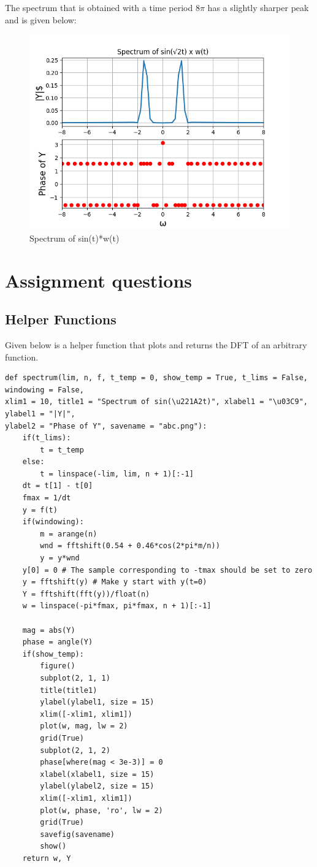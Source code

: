 \documentclass{article}
\begin{document}
The spectrum that is obtained with a time period $8\pi$ has a slightly sharper peak and is given below:
\begin{figure}[h!]
\centering
\includegraphics[scale=0.6]{fig10-7.png}
\caption{Spectrum of sin(t)*w(t)}
\label{fig:universe}
\end{figure}

\section{Assignment questions}

\subsection{Helper Functions}
Given below is a helper function that plots and returns the DFT of an arbitrary function.

\lstset{language=Python}
\lstset{frame=lines}
\lstset{basicstyle=\footnotesize}
\begin{lstlisting}
def spectrum(lim, n, f, t_temp = 0, show_temp = True, t_lims = False, windowing = False, 
xlim1 = 10, title1 = "Spectrum of sin(\u221A2t)", xlabel1 = "\u03C9", ylabel1 = "|Y|", 
ylabel2 = "Phase of Y", savename = "abc.png"):
    if(t_lims):
        t = t_temp
    else:
        t = linspace(-lim, lim, n + 1)[:-1]
    dt = t[1] - t[0]
    fmax = 1/dt
    y = f(t)
    if(windowing):
        m = arange(n)
        wnd = fftshift(0.54 + 0.46*cos(2*pi*m/n))
        y = y*wnd
    y[0] = 0 # The sample corresponding to -tmax should be set to zero
    y = fftshift(y) # Make y start with y(t=0)
    Y = fftshift(fft(y))/float(n)
    w = linspace(-pi*fmax, pi*fmax, n + 1)[:-1]
    
    mag = abs(Y)
    phase = angle(Y)
    if(show_temp):
        figure()
        subplot(2, 1, 1)
        title(title1)
        ylabel(ylabel1, size = 15)
        xlim([-xlim1, xlim1])
        plot(w, mag, lw = 2)
        grid(True)
        subplot(2, 1, 2)
        phase[where(mag < 3e-3)] = 0
        xlabel(xlabel1, size = 15)
        ylabel(ylabel2, size = 15)
        xlim([-xlim1, xlim1])
        plot(w, phase, 'ro', lw = 2)
        grid(True)
        savefig(savename)
        show()
    return w, Y
\end{lstlisting}
\end{document}
